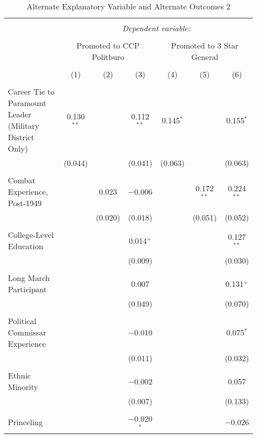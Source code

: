 
\begin{table}[!htbp] \centering 
  \caption{Alternate Explanatory Variable and Alternate Outcomes 2} 
  \label{table_a7} 
\begin{tabular}{@{\extracolsep{5pt}}lcccccc} 
\\[-1.8ex]\hline 
\hline \\[-1.8ex] 
 & \multicolumn{6}{c}{\textit{Dependent variable:}} \\ 
\cline{2-7} 
\\[-1.8ex] & \multicolumn{3}{c}{Promoted to CCP Politburo} & \multicolumn{3}{c}{Promoted to 3 Star General} \\ 
\\[-1.8ex] & (1) & (2) & (3) & (4) & (5) & (6)\\ 
\hline \\[-1.8ex] 
 Career Tie to Paramount Leader (Military District Only) & 0.130$^{**}$ &  & 0.112$^{**}$ & 0.145$^{*}$ &  & 0.155$^{*}$ \\ 
  & (0.044) &  & (0.041) & (0.063) &  & (0.063) \\ 
  & & & & & & \\ 
 Combat Experience, Post-1949 &  & 0.023 & $-$0.006 &  & 0.172$^{**}$ & 0.224$^{**}$ \\ 
  &  & (0.020) & (0.018) &  & (0.051) & (0.052) \\ 
  & & & & & & \\ 
 College-Level Education &  &  & 0.014$^{+}$ &  &  & 0.127$^{**}$ \\ 
  &  &  & (0.009) &  &  & (0.030) \\ 
  & & & & & & \\ 
 Long March Participant &  &  & 0.007 &  &  & 0.131$^{+}$ \\ 
  &  &  & (0.049) &  &  & (0.070) \\ 
  & & & & & & \\ 
 Political Commissar Experience &  &  & $-$0.010 &  &  & 0.075$^{*}$ \\ 
  &  &  & (0.011) &  &  & (0.032) \\ 
  & & & & & & \\ 
 Ethnic Minority &  &  & $-$0.002 &  &  & 0.057 \\ 
  &  &  & (0.007) &  &  & (0.133) \\ 
  & & & & & & \\ 
 Princeling &  &  & $-$0.020$^{*}$ &  &  & $-$0.026 \\ 

\end{tabular}
\end{table}
